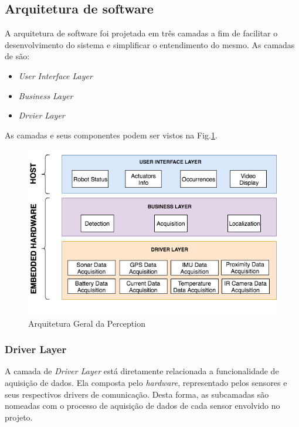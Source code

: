 \subsection{Arquitetura de software}
\label{ssec:arqs}


A arquitetura de software foi projetada em três camadas a fim de facilitar o desenvolvimento do sistema e simplificar o entendimento do mesmo. As camadas de são:

\begin{itemize}
	\item \textit{User Interface Layer}
	\item \textit{Business Layer}
	\item \textit{Drvier Layer}
\end{itemize}
 
As camadas e seus componentes podem ser vistos na Fig.\ref{arqsoft}.

\begin{figure}[h]
	\centering
	\includegraphics[width=15cm]{Figures/ArquiteturadeSoftware.png}
	\caption{Arquitetura Geral da Perception}
	\label{arqsoft}
\end{figure}

\subsubsection{Driver Layer}
	
A camada de \textit{Driver Layer} está diretamente relacionada a funcionalidade de aquisição de dados. Ela composta pelo \textit{hardware}, representado pelos sensores e seus respectivos drivers de comunicação. Desta forma, as subcamadas são nomeadas com o processo de aquisição de dados de cada sensor envolvido no projeto.

